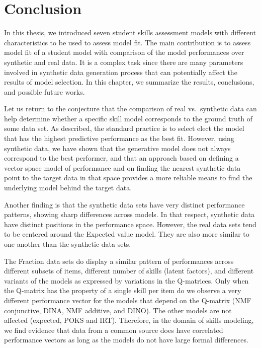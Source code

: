 \label{sec:Conclusion}

\section{Conclusion}
In this thesis, we introduced seven student skills assessment models with different characteristics to be used to assess model fit. The main contribution is to assess model fit of a student model with comparison of the model performances over synthetic and real data. It is a complex task since there are many parameters involved in synthetic data generation process that can potentially affect the results of model selection. In this chapter, we summarize the results, conclusions, and possible future works.



Let us return to the conjecture that the comparison of real vs.\ synthetic data can help determine whether a specific skill model corresponds to the ground truth of some data set. As described, the standard practice is to select elect the model that has the highest predictive performance as the best fit.  However, using synthetic data, we have shown that the generative model does not always correspond to the best performer, and that an approach based on defining a vector space model of performance and on finding the nearest synthetic data point to the target data in that space provides a more reliable means to find the underlying model behind the target data.

Another finding is that the synthetic data sets have very distinct performance patterns, showing sharp differences across models.  In that respect, synthetic data have distinct positions in the performance space. However, the real data sets tend to be centered around the Expected value model.  They are also more similar to one another than the synthetic data sets.

The Fraction data sets do display a similar pattern of performances across different subsets of items, different number of skills (latent factors), and different variants of the models as expressed by variations in the Q-matrices. Only when the Q-matrix has the property of a single skill per item do we observe a very different performance vector for the models that depend on the Q-matrix (NMF conjunctive, DINA, NMF additive, and DINO).  The other models are not affected (expected, POKS and IRT).  Therefore, in the domain of skills modeling, we find evidence that data from a common source does have correlated performance vectors as long as the models do not have large formal differences.

